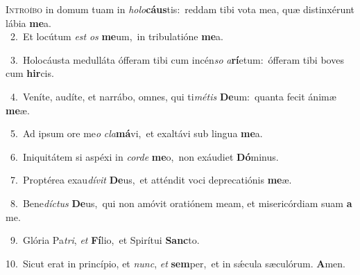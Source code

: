 \lettrine{\initial\textcolor{\initialcolor}{I}}{ntroíbo} in domum tuam in \textit{ho}\-\textit{lo}\textbf{cáus}tis:~\star reddam tibi vota mea, quæ distinxérunt lábia \textbf{me}\-a.\\
{\numbfont\textcolor{\numbcolor}{~2.}}~Et locútum \textit{est} \textit{os} \textbf{me}\-um,~\star in tribulatióne \textbf{me}\-a.\par
{\numbfont\textcolor{\numbcolor}{~3.}}~Holocáusta medulláta ófferam tibi cum incén\textit{so} \textit{a}\-\textbf{rí}etum:~\star ófferam tibi boves cum \textbf{hir}\-cis.\par
{\numbfont\textcolor{\numbcolor}{~4.}}~Veníte, audíte, et narrábo, omnes, qui ti\-\textit{mé}\-\textit{tis} \textbf{De}\-um:~\star quanta fecit ánimæ \textbf{me}\-æ.\par
{\numbfont\textcolor{\numbcolor}{~5.}}~Ad ipsum ore me\textit{o} \textit{cla}\-\textbf{má}vi,~\star et exaltávi sub lingua \textbf{me}\-a.\par
{\numbfont\textcolor{\numbcolor}{~6.}}~Iniquitátem si aspéxi in \textit{cor}\-\textit{de} \textbf{me}\-o,~\star non exáudiet \textbf{Dó}\-minus.\par
{\numbfont\textcolor{\numbcolor}{~7.}}~Proptérea exau\-\textit{dí}\-\textit{vit} \textbf{De}\-us,~\star et atténdit voci deprecatiónis \textbf{me}\-æ.\par
{\numbfont\textcolor{\numbcolor}{~8.}}~Bene\-\textit{díc}\-\textit{tus} \textbf{De}\-us,~\star qui non amóvit oratiónem meam, et misericórdiam suam \textbf{a} me.\par
{\numbfont\textcolor{\numbcolor}{~9.}}~Glória Pa\-\textit{tri}\-, \textit{et} \textbf{Fí}\-lio,~\star et Spirítui \textbf{Sanc}\-to.\par
{\numbfont\textcolor{\numbcolor}{10.}}~Sicut erat in princípio, et \textit{nunc}\-, \textit{et} \textbf{sem}\-per,~\star et in sǽcula sæculórum. \textbf{A}\-men.\par
